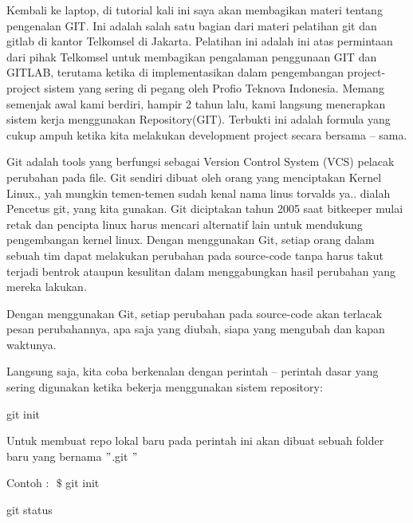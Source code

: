 \noindent 
Kembali ke laptop, di tutorial kali ini saya akan membagikan materi tentang pengenalan GIT. Ini adalah salah satu bagian dari materi pelatihan git dan gitlab di kantor Telkomsel di Jakarta. Pelatihan ini adalah ini atas permintaan dari pihak Telkomsel untuk membagikan pengalaman penggunaan GIT dan GITLAB, terutama ketika di implementasikan dalam pengembangan project-project sistem yang sering di pegang oleh Profio Teknova Indonesia. Memang semenjak awal kami berdiri, hampir 2 tahun lalu, kami langsung menerapkan sistem kerja menggunakan Repository(GIT). Terbukti ini adalah formula yang cukup ampuh ketika kita melakukan development project secara bersama – sama. \par
\vspace{12pt}
\noindent 
Git adalah tools yang berfungsi sebagai Version Control System (VCS) pelacak perubahan pada file. Git sendiri dibuat oleh orang yang menciptakan Kernel Linux., yah mungkin temen-temen sudah kenal nama linus torvalds ya.. dialah Pencetus git, yang kita gunakan. Git diciptakan tahun 2005 saat bitkeeper mulai retak dan pencipta linux harus mencari alternatif lain untuk mendukung pengembangan kernel linux. Dengan menggunakan Git, setiap orang dalam sebuah tim dapat melakukan perubahan pada source-code tanpa harus takut terjadi bentrok ataupun kesulitan dalam menggabungkan hasil perubahan yang mereka lakukan. \par
\noindent 
\vspace{\baselineskip}
Dengan menggunakan Git, setiap perubahan pada source-code akan terlacak pesan perubahannya, apa saja yang diubah, siapa yang mengubah dan kapan waktunya. \par
\vspace{12pt}
\noindent 
Langsung saja, kita coba berkenalan dengan perintah – perintah dasar yang sering digunakan ketika bekerja menggunakan sistem repository: \par
\vspace{12pt}
\noindent 
git init $  $ \par
\noindent 
\vspace{\baselineskip}
Untuk membuat repo lokal baru pada perintah ini akan dibuat sebuah folder baru yang bernama  $ " $.git $ " $ \par
\noindent 
\vspace{\baselineskip}
Contoh : $  $ $  \$  $ git init \par
\vspace{12pt}
\noindent 
git status $  $ \par
\noindent 
